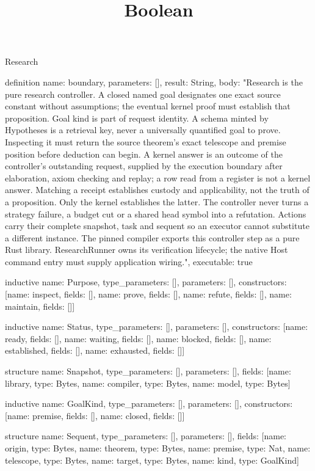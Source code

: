 \begin{lexlean}{Research}
\title{Boolean}
\begin{semanticmodule}
definition{
  name: boundary,
  parameters: [],
  result: String,
  body: "Research is the pure research controller. A closed named goal designates one exact source constant without assumptions; the eventual kernel proof must establish that proposition. Goal kind is part of request identity. A schema minted by Hypotheses is a retrieval key, never a universally quantified goal to prove. Inspecting it must return the source theorem's exact telescope and premise position before deduction can begin. A kernel answer is an outcome of the controller's outstanding request, supplied by the execution boundary after elaboration, axiom checking and replay; a row read from a register is not a kernel answer. Matching a receipt establishes custody and applicability, not the truth of a proposition. Only the kernel establishes the latter. The controller never turns a strategy failure, a budget cut or a shared head symbol into a refutation. Actions carry their complete snapshot, task and sequent so an executor cannot substitute a different instance. The pinned compiler exports this controller step as a pure Rust library. ResearchRunner owns its verification lifecycle; the native Host command entry must supply application wiring.",
  executable: true
}

inductive{
  name: Purpose,
  type_parameters: [],
  parameters: [],
  constructors: [{name: inspect, fields: []}, {name: prove, fields: []}, {name: refute, fields: []}, {name: maintain, fields: []}]
}

inductive{
  name: Status,
  type_parameters: [],
  parameters: [],
  constructors: [{name: ready, fields: []}, {name: waiting, fields: []}, {name: blocked, fields: []}, {name: established, fields: []}, {name: exhausted, fields: []}]
}

structure{
  name: Snapshot,
  type_parameters: [],
  parameters: [],
  fields: [{name: library, type: Bytes}, {name: compiler, type: Bytes}, {name: model, type: Bytes}]
}

inductive{
  name: GoalKind,
  type_parameters: [],
  parameters: [],
  constructors: [{name: premise, fields: []}, {name: closed, fields: []}]
}

structure{
  name: Sequent,
  type_parameters: [],
  parameters: [],
  fields: [{name: origin, type: Bytes}, {name: theorem, type: Bytes}, {name: premise, type: Nat}, {name: telescope, type: Bytes}, {name: target, type: Bytes}, {name: kind, type: GoalKind}]
}


\end{semanticmodule}
\end{lexlean}
